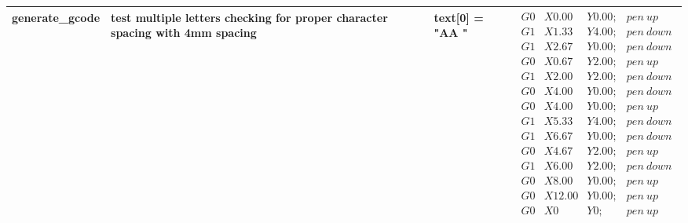 \begin{longtable}{|>{\raggedright\arraybackslash}m{}|>{\raggedright\arraybackslash}m{}|>{\raggedright\arraybackslash}m{}|>{\raggedright\arraybackslash}m{}|}
    generate\_gcode & test multiple letters checking for proper character spacing with 4mm spacing & text[0] = "AA " &  \footnotesize$\begin{array}{cccl}
        G0 &X0.00 &Y0.00; & pen\ up\\
        G1 &X1.33 &Y4.00; & pen\ down\\
        G1 &X2.67 &Y0.00; & pen\ down\\
        G0 &X0.67 &Y2.00; & pen\ up\\
        G1 &X2.00 &Y2.00; & pen\ down\\
        G0 &X4.00 &Y0.00; & pen\ down\\
        G0 &X4.00 &Y0.00; & pen\ up\\
        G1 &X5.33 &Y4.00; & pen\ down\\
        G1 &X6.67 &Y0.00; & pen\ down\\
        G0 &X4.67 &Y2.00; & pen\ up\\
        G1 &X6.00 &Y2.00; & pen\ down\\
        G0 &X8.00 &Y0.00; & pen\ up\\
        G0 &X12.00 &Y0.00; & pen\ up\\
        G0 &X0 &Y0; & pen\ up\\
        \end{array}$ \\ \hline




\end{longtable}

